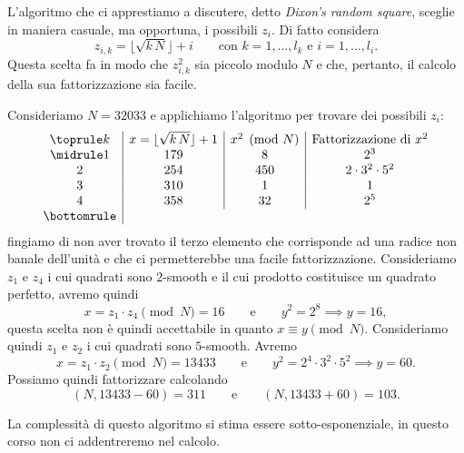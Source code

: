 	L'algoritmo che ci apprestiamo a discutere, detto \emph{Dixon's random square}, sceglie in maniera casuale, ma opportuna, i possibili \(z_i\).
	Di fatto considera
		\[
		z_{i,k} = \lfloor\sqrt{k\,N}\rfloor + i \qquad\text{con }k = 1,\ldots,l_k \text{ e }i = 1,\ldots,l_i.
		\]
	Questa scelta fa in modo che \(z_{i,k}^2\) sia piccolo modulo \(N\) e che, pertanto, il calcolo della sua fattorizzazione sia facile.

	\begin{ese}
	Consideriamo \(N=32033\) e applichiamo l'algoritmo per trovare dei possibili \(z_i\):
		\[
		\begin{array}{c|c|c|c}
		\toprule
		k & x=\lfloor\sqrt{k\,N}\rfloor+1 & x^2 \pmod{N} & \text{Fattorizzazione di }x^2\\
		\midrule
		1 & 179 & 8 & 2^3\\
		2 & 254 & 450 & 2 \cdot 3^2 \cdot 5^2\\
		3 & 310 & 1 & 1\\
		4 & 358 & 32 & 2^5\\
		\bottomrule
		\end{array}
		\]
	fingiamo di non aver trovato il terzo elemento che corrisponde ad una radice non banale dell'unità e che ci permetterebbe una facile fattorizzazione.
	Consideriamo \(z_1\) e \(z_4\) i cui quadrati sono \(2\)-smooth e il cui prodotto costituisce un quadrato perfetto, avremo quindi
		\[
		x = z_1 \cdot z_4 \pmod{N} = 16 \qquad\text{e}\qquad y^2 = 2^8 \implies y = 16,
		\]
	questa scelta non è quindi accettabile in quanto \(x \equiv y \pmod{N}\).
	Consideriamo quindi \(z_1\) e \(z_2\) i cui quadrati sono \(5\)-smooth. Avremo
		\[
		x = z_1 \cdot z_2 \pmod{N} = 13433 \qquad\text{e}\qquad y^2 = 2^4 \cdot 3^2 \cdot 5^2 \implies y = 60.
		\]
	Possiamo quindi fattorizzare calcolando
		\[
		(N,13433-60) = 311 \qquad\text{e}\qquad (N,13433+60) = 103.
		\]
	\end{ese}

	La complessità di questo algoritmo si stima essere sotto-esponenziale, in questo corso non ci addentreremo nel calcolo.